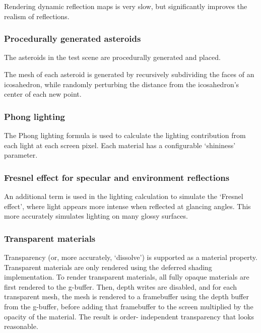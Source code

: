 \documentclass[11pt]{scrartcl} %
\begin{document}
            Rendering dynamic reflection maps is very slow, but significantly
            improves the realism of reflections.

        \subsubsection{Procedurally generated asteroids}

            The asteroids in the test scene are procedurally generated and
            placed.

            The mesh of each asteroid is generated by recursively subdividing
            the faces of an icosahedron, while randomly perturbing the distance
            from the icosahedron's center of each new point.

        \subsubsection{Phong lighting}

            The Phong lighting formula is used to calculate the lighting
            contribution from each light at each screen pixel. Each material
            has a configurable `shininess' parameter.

        \subsubsection{Fresnel effect for specular and environment reflections}

            An additional term is used in the lighting calculation to simulate
            the `Fresnel effect', where light appears more intense when
            reflected at glancing angles. This more accurately simulates
            lighting on many glossy surfaces.

        \subsubsection{Transparent materials}

            Transparency (or, more accurately, `dissolve') is supported as a
            material property. Transparent materials are only rendered using
            the deferred shading implementation. To render transparent
            materials, all fully opaque materials are first rendered to the
            g-buffer. Then, depth writes are disabled, and for each transparent
            mesh, the mesh is rendered to a framebuffer using the depth buffer
            from the g-buffer, before adding that framebuffer to the screen
            multiplied by the opacity of the material. The result is order-
            independent transparency that looks reasonable.
\end{document}
